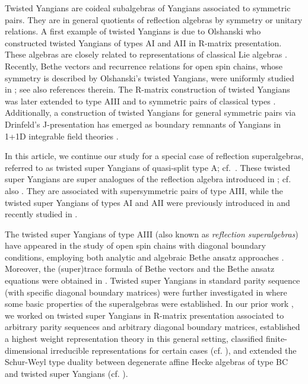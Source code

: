\documentclass[11pt,reqno]{amsart}
\numberwithin{equation}{section}
\theoremstyle{definition}
\theoremstyle{remark}
\begin{document}
Twisted Yangians are coideal subalgebras of Yangians associated to symmetric pairs. They are in general quotients of reflection algebras by symmetry or unitary relations. A first example of twisted Yangians is due to
Olshanski \cite{Olshanski1992twisted} who constructed twisted Yangians of types AI and AII in R-matrix presentation. These algebras are closely related to representations of classical Lie algebras \cite{Molev2007book}. Recently, Bethe vectors and recurrence relations for open spin chains, whose symmetry is described by Olshanski's twisted Yangians, were uniformly studied in \cite{regelskis2024bethe}; see also references therein. The R-matrix construction of twisted Yangians was later extended to type AIII \cite{Molev2002reflection} and to symmetric pairs of classical types \cite{Guay2016twisted}. Additionally, a construction of twisted Yangians for general symmetric pairs via Drinfeld's J-presentation has emerged as boundary remnants of Yangians in 1+1D integrable field theories \cite{MacKay2002rational,Belliard2017}.

In this article, we continue our study for a special case of reflection superalgebras, referred to as twisted super Yangians of quasi-split type A; cf.~\cite{lu2023twisted,lu2024drinfeld}. These twisted super Yangians are super analogues of the reflection algebra introduced in \cite{Molev2002reflection}; cf. also \cite{Chen2014twisted}. They are associated with supersymmetric pairs of type AIII, while the twisted super Yangians of types AI and AII were previously introduced in \cite{Briot2003twisted} and recently studied in \cite{Lin2024from,Lin2025Ber}. 

The twisted super Yangians of type AIII (also known as \textit{reflection superalgebras}) have appeared in the study of open spin chains with diagonal boundary conditions, employing both analytic and algebraic Bethe ansatz approaches \cite{Ragoucy2007analytical,Belliard2009nested}. Moreover, the (super)trace formula \cite{Tarasov13comb} of Bethe vectors and the Bethe ansatz equations were obtained in \cite{Belliard2009nested}. Twisted super Yangians in standard parity sequence (with specific diagonal boundary matrices) were further investigated in \cite{kettle2023orthosymplectic,bagnoli2023double} where some basic properties of the superalgebras were established. In our prior work \cite{lu2023twisted}, we worked on twisted super Yangians in R-matrix presentation associated to arbitrary parity sequences and arbitrary diagonal boundary matrices, established a highest weight representation theory in this general setting, classified finite-dimensional irreducible representations for certain cases (cf. \cite{Molev2002reflection}), and extended the Schur-Weyl type duality between degenerate affine Hecke algebras of type BC and twisted super Yangians (cf. \cite{Chen2014twisted}).
\end{document}
